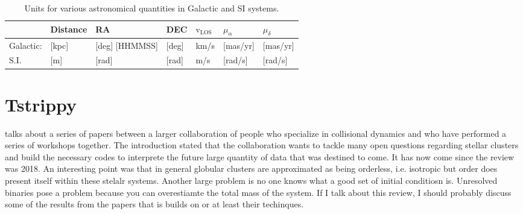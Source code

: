     \begin{table}[]
        \caption{Units for various astronomical quantities in Galactic and SI systems.}
        \label{tab:units}
        \begin{tabular}{l|l|l|l|l|l|l|}
                            & Distance  & RA                     & DEC                    & \textbf{$\mathrm{v}_\mathrm{LOS}$} & $\mu_\alpha$ & $\mu_\delta$ \\ \hline
            Galactic: & {[}kpc{]} & {[}deg{]} {[}HHMMSS{]} & {[}deg{]}  & km/s                      & {[}mas/yr{]} & {[}mas/yr{]} \\ \hline
            S.I.       & {[}m{]}   & {[}rad{]}              & {[}rad{]}              & m/s                       & {[}rad/s{]}  & {[}rad/s{]}  \\ 
        \end{tabular}
    \end{table}


\section{Tstrippy}

    \citet{2018ComAC...5....2V} talks about a series of papers between a larger collaboration of people who specialize in collisional dynamics and who have performed a series of workshops together. The introduction stated that the collaboration wants to tackle many open questions regarding stellar clusters and build the necessary codes to interprete the future large quantity of data that was destined to come. It has now come since the review was 2018. An interesting point was that in general globular clusters are approximated as being orderless, i.e. isotropic but order does present itself within these stelalr systems. Another large problem is no one knows what a good set of initial conditiosn is. Unresolved binaries pose a problem because you can overestiamte the total mass of the system. If I talk about this review, I should probably discuss some of the results from the papers that is builds on or at least their techinques.

